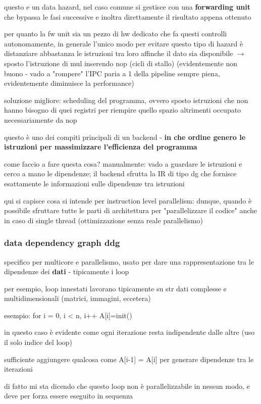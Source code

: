 questo e un data hazard, nel caso comune si gestisce con una \textbf{forwarding unit} che bypassa le fasi successive e inoltra direttamente il risultato appena ottenuto

per quanto la fw unit sia un pezzo di hw dedicato che fa questi controlli autonomamente, in generale l'unico modo per evitare questo tipo di hazard \`e distanziare abbastanza le istruzioni tra loro affinche il dato sia disponibile $\rightarrow$ sposto l'istruzione di mul inserendo nop (cicli di stallo) (evidentemente non buono - vado a "rompere" l'IPC paria a 1 della pipeline sempre piena, evidentemente diminuisce la performance)

soluzione migliore: scheduling del programma, ovvero sposto istruzioni che non hanno bisogno di quei registri per riempire quello spazio altrimenti occupato necessariamente da nop

questo \`e uno dei compiti principali di un backend - \textbf{in che ordine genero le istruzioni per massimizzare l'efficienza del programma}

come faccio a fare questa cosa? manualmente: vado a guardare le istruzioni e cerco a mano le dipendenze; il backend sfrutta la IR di tipo dg che fornisce esattamente le informazioni sulle dipendenze tra istruzioni

qui si capisce cosa si intende per instruction level parallelism: dunque, quando \`e possibile sfruttare tutte le parti di architettura per "parallelizzare il codice" anche in caso di single thread (ottimizzazione senza reale parallelismo)


\subsubsection{data dependency graph ddg}

specifico per multicore e parallelismo, usato per dare una rappresentazione tra le dipendenze dei \textbf{dati} - tipicamente i loop

per esempio, loop innestati lavorano tipicamente su str dati complesse e multidimensionali (matrici, immagini, eccetera)

esempio: for i = 0, i < n, i++
A[i]=init()

in questo caso \`e evidente come ogni iterazione resta indipendente dalle altre (uso il solo indice del loop)

sufficiente aggiungere qualcosa come A[i-1] = A[i] per generare dipendenze tra le iterazioni

di fatto mi sta dicendo che questo loop non \`e parallelizzabile in nessun modo, e deve per forza essere eseguito in sequenza

